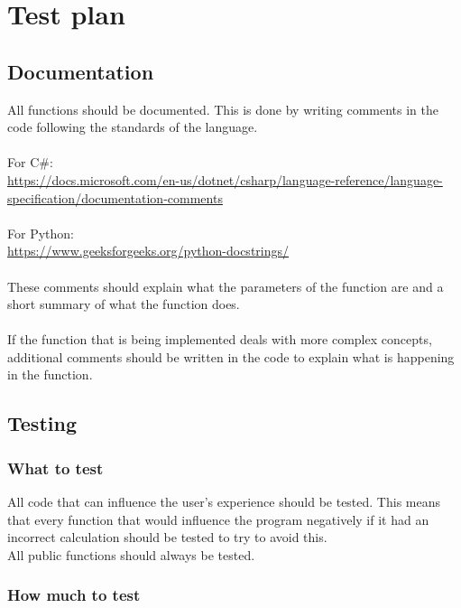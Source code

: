 \section{Test plan}

\subsection{Documentation}
All functions should be documented. 
This is done by writing comments in the code following the standards of the language.
\\\\
For C\#: 
\\
\url{https://docs.microsoft.com/en-us/dotnet/csharp/language-reference/language-specification/documentation-comments}
\\\\
For Python:
\\
\url{https://www.geeksforgeeks.org/python-docstrings/}
\\\\
These comments should explain what the parameters of the function are and a short summary of what the function does.
\\\\
If the function that is being implemented deals with more complex concepts, additional comments should be written in the code to explain what is happening in the function.

\subsection{Testing}
\subsubsection{What to test}
All code that can influence the user's experience should be tested. 
This means that every function that would influence the program negatively if it had an incorrect calculation should be tested to try to avoid this.
\\
All public functions should always be tested.

\subsubsection{How much to test}

